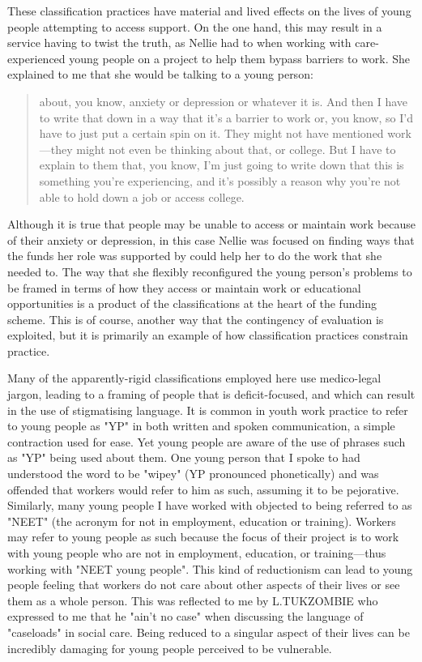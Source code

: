 These classification practices have material and lived effects on the lives of young people attempting to access support. On the one hand, this may result in a service having to twist the truth, as Nellie had to when working with care-experienced young people on a project to help them bypass barriers to work. She explained to me that she would be talking to a young person:
\begin{quote}
about, you know, anxiety or depression or whatever it is. And then I have to write that down in a way that it's a barrier to work or, you know, so I'd have to just put a certain spin on it. They might not have mentioned work—they might not even be thinking about that, or college. But I have to explain to them that, you know, I'm just going to write down that this is something you're experiencing, and it's possibly a reason why you're not able to hold down a job or access college.
\end{quote}
Although it is true that people may be unable to access or maintain work because of their anxiety or depression, in this case Nellie was focused on finding ways that the funds her role was supported by could help her to do the work that she needed to. The way that she flexibly reconfigured the young person's problems to be framed in terms of how they access or maintain work or educational opportunities is a product of the classifications at the heart of the funding scheme. This is of course, another way that the contingency of evaluation is exploited, but it is primarily an example of how classification practices constrain practice.

Many of the apparently-rigid classifications employed here use medico-legal jargon, leading to a framing of people that is deficit-focused, and which can result in the use of stigmatising language. It is common in youth work practice to refer to young people as "YP" in both written and spoken communication, a simple contraction used for ease. Yet young people are aware of the use of phrases such as "YP" being used about them. One young person that I spoke to had understood the word to be "wipey" (YP pronounced phonetically) and was offended that workers would refer to him as such, assuming it to be pejorative. Similarly, many young people I have worked with objected to being referred to as "NEET" (the acronym for not in employment, education or training). Workers may refer to young people as such because the focus of their project is to work with young people who are not in employment, education, or training—thus working with "NEET young people". This kind of reductionism can lead to young people feeling that workers do not care about other aspects of their lives or see them as a whole person. This was reflected to me by L.TUKZOMBIE who expressed to me that he "ain't no case" when discussing the language of "caseloads" in social care. Being reduced to a singular aspect of their lives can be incredibly damaging for young people perceived to be vulnerable.  

